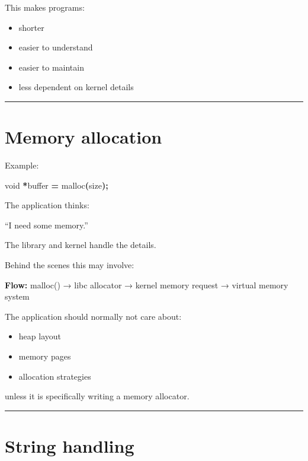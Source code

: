 \documentclass[
  oneside,
  openany]{book}
\newenvironment{Shaded}{\begin{snugshade}}{\end{snugshade}}
\newcommand{\DataTypeTok}[1]{\textcolor[rgb]{0.13,0.29,0.53}{#1}}
\newcommand{\NormalTok}[1]{#1}
\newcommand{\OperatorTok}[1]{\textcolor[rgb]{0.81,0.36,0.00}{\textbf{#1}}}
\providecommand{\tightlist}{%
  \setlength{\itemsep}{0pt}\setlength{\parskip}{0pt}}
\begin{document}
This makes programs:

\begin{itemize}
\tightlist
\item
  shorter
\item
  easier to understand
\item
  easier to maintain
\item
  less dependent on kernel details
\end{itemize}

\begin{center}\rule{0.5\linewidth}{0.5pt}\end{center}

\hypertarget{memory-allocation}{%
\section{Memory allocation}\label{memory-allocation}}

Example:

\begin{Shaded}
\begin{Highlighting}[]
\DataTypeTok{void} \OperatorTok{*}\NormalTok{buffer }\OperatorTok{=}\NormalTok{ malloc}\OperatorTok{(}\NormalTok{size}\OperatorTok{);}
\end{Highlighting}
\end{Shaded}

The application thinks:

``I need some memory.''

The library and kernel handle the details.

Behind the scenes this may involve:

\textbf{Flow:} malloc() → libc allocator → kernel memory request →
virtual memory system

The application should normally not care about:

\begin{itemize}
\tightlist
\item
  heap layout
\item
  memory pages
\item
  allocation strategies
\end{itemize}

unless it is specifically writing a memory allocator.

\begin{center}\rule{0.5\linewidth}{0.5pt}\end{center}

\hypertarget{string-handling}{%
\section{String handling}\label{string-handling}}
\end{document}
